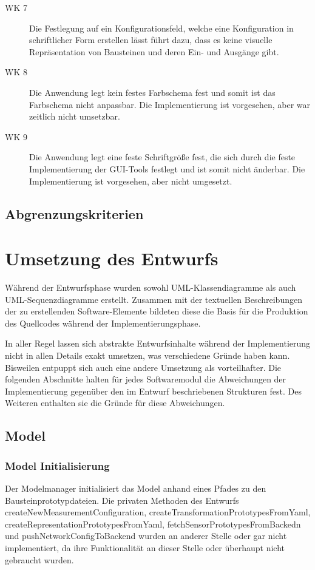 \documentclass[parskip=full]{scrartcl}
\begin{document}
\begin{description}
\item[WK 7] Die Festlegung auf ein Konfigurationsfeld, welche eine Konfiguration in schriftlicher Form erstellen lässt führt dazu, dass es keine visuelle Repräsentation von Bausteinen und deren Ein- und Ausgänge gibt.
\item[WK 8] Die Anwendung legt kein festes Farbschema fest und somit ist das Farbschema nicht anpassbar. Die Implementierung ist vorgesehen, aber war zeitlich nicht umsetzbar.
\item[WK 9] Die Anwendung legt eine feste Schriftgröße fest, die sich durch die feste Implementierung der GUI-Tools festlegt und ist somit nicht änderbar. Die Implementierung ist vorgesehen, aber nicht umgesetzt.
\end{description}

\subsection{Abgrenzungskriterien}

\clearpage
\section{Umsetzung des Entwurfs}

Während der Entwurfsphase wurden sowohl UML-Klassendiagramme als auch UML-Sequenzdiagramme erstellt. Zusammen mit der textuellen Beschreibungen der zu erstellenden Software-Elemente bildeten diese die Basis für die Produktion des Quellcodes während der Implementierungsphase. 

In aller Regel lassen sich abstrakte Entwurfsinhalte während der Implementierung nicht in allen Details exakt umsetzen, was verschiedene Gründe haben kann. Bisweilen entpuppt sich auch eine andere Umsetzung als vorteilhafter. Die folgenden Abschnitte halten für jedes Softwaremodul die Abweichungen der Implementierung gegenüber den im Entwurf beschriebenen Strukturen fest. Des Weiteren enthalten sie die Gründe für diese Abweichungen. 
\clearpage

\subsection{Model}

\subsubsection{Model Initialisierung}
Der Modelmanager initialisiert das Model anhand eines Pfades zu den Bausteinprototypdateien. Die privaten Methoden des Entwurfs createNewMeasurementConfiguration, createTransformationPrototypesFromYaml, createRepresentationPrototypesFromYaml, fetchSensorPrototypesFromBackedn und pushNetworkConfigToBackend wurden an anderer Stelle oder gar nicht implementiert, da ihre Funktionalität an dieser Stelle oder überhaupt nicht gebraucht wurden.
\end{document}
